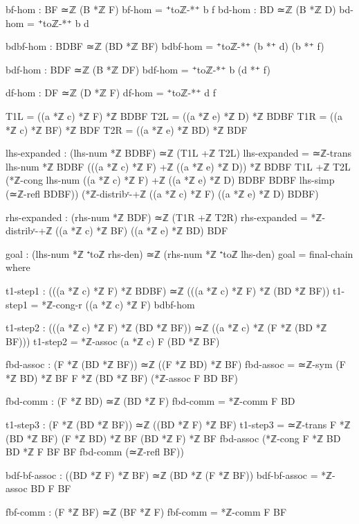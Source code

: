 \documentclass[11pt,a4paper]{book}
\begin{document}
\begin{code}
    bf-hom : BF ≃ℤ (B *ℤ F)
    bf-hom = ⁺toℤ-*⁺ b f
    bd-hom : BD ≃ℤ (B *ℤ D)
    bd-hom = ⁺toℤ-*⁺ b d

    bdbf-hom : BDBF ≃ℤ (BD *ℤ BF)
    bdbf-hom = ⁺toℤ-*⁺ (b *⁺ d) (b *⁺ f)
    
    bdf-hom : BDF ≃ℤ (B *ℤ DF)
    bdf-hom = ⁺toℤ-*⁺ b (d *⁺ f)

    df-hom : DF ≃ℤ (D *ℤ F)
    df-hom = ⁺toℤ-*⁺ d f

    T1L = ((a *ℤ c) *ℤ F) *ℤ BDBF
    T2L = ((a *ℤ e) *ℤ D) *ℤ BDBF
    T1R = ((a *ℤ c) *ℤ BF) *ℤ BDF
    T2R = ((a *ℤ e) *ℤ BD) *ℤ BDF

    lhs-expanded : (lhs-num *ℤ BDBF) ≃ℤ (T1L +ℤ T2L)
    lhs-expanded = ≃ℤ-trans {lhs-num *ℤ BDBF} 
                    {(((a *ℤ c) *ℤ F) +ℤ ((a *ℤ e) *ℤ D)) *ℤ BDBF}
                    {T1L +ℤ T2L}
                    (*ℤ-cong {lhs-num} {((a *ℤ c) *ℤ F) +ℤ ((a *ℤ e) *ℤ D)} 
                             {BDBF} {BDBF} lhs-simp (≃ℤ-refl BDBF))
                    (*ℤ-distribʳ-+ℤ ((a *ℤ c) *ℤ F) ((a *ℤ e) *ℤ D) BDBF)

    rhs-expanded : (rhs-num *ℤ BDF) ≃ℤ (T1R +ℤ T2R)
    rhs-expanded = *ℤ-distribʳ-+ℤ ((a *ℤ c) *ℤ BF) ((a *ℤ e) *ℤ BD) BDF

    goal : (lhs-num *ℤ ⁺toℤ rhs-den) ≃ℤ (rhs-num *ℤ ⁺toℤ lhs-den)
    goal = final-chain
      where
        
        t1-step1 : (((a *ℤ c) *ℤ F) *ℤ BDBF) ≃ℤ (((a *ℤ c) *ℤ F) *ℤ (BD *ℤ BF))
        t1-step1 = *ℤ-cong-r ((a *ℤ c) *ℤ F) bdbf-hom
        
        t1-step2 : (((a *ℤ c) *ℤ F) *ℤ (BD *ℤ BF)) ≃ℤ ((a *ℤ c) *ℤ (F *ℤ (BD *ℤ BF)))
        t1-step2 = *ℤ-assoc (a *ℤ c) F (BD *ℤ BF)
        
        fbd-assoc : (F *ℤ (BD *ℤ BF)) ≃ℤ ((F *ℤ BD) *ℤ BF)
        fbd-assoc = ≃ℤ-sym {(F *ℤ BD) *ℤ BF} {F *ℤ (BD *ℤ BF)} (*ℤ-assoc F BD BF)
        
        fbd-comm : (F *ℤ BD) ≃ℤ (BD *ℤ F)
        fbd-comm = *ℤ-comm F BD
        
        t1-step3 : (F *ℤ (BD *ℤ BF)) ≃ℤ ((BD *ℤ F) *ℤ BF)
        t1-step3 = ≃ℤ-trans {F *ℤ (BD *ℤ BF)} {(F *ℤ BD) *ℤ BF} {(BD *ℤ F) *ℤ BF}
                    fbd-assoc 
                    (*ℤ-cong {F *ℤ BD} {BD *ℤ F} {BF} {BF} fbd-comm (≃ℤ-refl BF))
        
        bdf-bf-assoc : ((BD *ℤ F) *ℤ BF) ≃ℤ (BD *ℤ (F *ℤ BF))
        bdf-bf-assoc = *ℤ-assoc BD F BF
        
        fbf-comm : (F *ℤ BF) ≃ℤ (BF *ℤ F)
        fbf-comm = *ℤ-comm F BF
        

\end{code}
\end{document}
